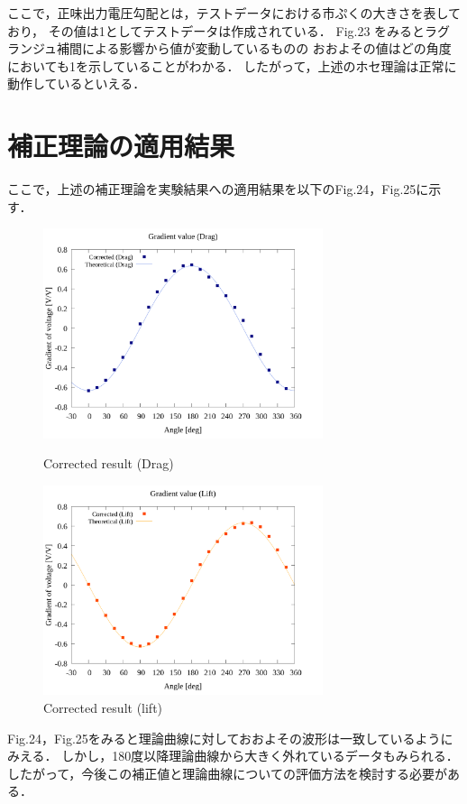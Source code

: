 \documentclass[twocolumn,a4j]{jsarticle}
\begin{document}
\newpage

ここで，正味出力電圧勾配とは，テストデータにおける市ぷくの大きさを表しており，
その値は1としてテストデータは作成されている．
Fig.23 をみるとラグランジュ補間による影響から値が変動しているものの
おおよその値はどの角度においても1を示していることがわかる．
したがって，上述のホセ理論は正常に動作しているといえる．

\section{補正理論の適用結果}

ここで，上述の補正理論を実験結果への適用結果を以下のFig.24，Fig.25に示す．

\begin{figure}[htbp]
    \begin{center}
        \includegraphics[width=82mm]{../../../02_workspace/result/2-ex/plot/21/21-4_corrected_angle_drag.png}
        \caption{Corrected result (Drag)}
        \includegraphics[width=82mm]{../../../02_workspace/result/2-ex/plot/21/21-4_corrected_angle_lift.png}
        \caption{Corrected result (lift)}
    \end{center}
\end{figure}

Fig.24，Fig.25をみると理論曲線に対しておおよその波形は一致しているようにみえる．
しかし，180度以降理論曲線から大きく外れているデータもみられる．
したがって，今後この補正値と理論曲線についての評価方法を検討する必要がある．
\end{document}
